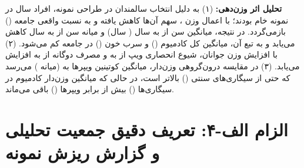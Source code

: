 \documentclass[12pt]{exam}
\begin{document}
\begin{table}[htbp]
\centering
\caption{مقایسه نسبت‌ها (درصدهای) خام و وزن‌دار () برای متغیرهای طبقه‌ای در جمعیت تحلیلی ()}
\end{table}

\textbf{تحلیل اثر وزن‌دهی:} (۱) به دلیل انتخاب  سالمندان در طراحی نمونه، افراد  سال در نمونه خام  بودند؛ با اعمال وزن ، سهم آن‌ها  کاهش یافته و به نسبت واقعی جامعه () بازمی‌گردد. در نتیجه، میانگین سن از  به  سال ( سال) و میانه سن از  به  سال کاهش می‌یابد و به تبع آن، میانگین کل کادمیوم () و سرب خون () در جامعه کم می‌شود. (۲) با افزایش وزن جوانان، شیوع انحصاری ویپ از  به  و مصرف دوگانه از  به  افزایش می‌یابد. (۳) در مقایسه درون‌گروهی وزن‌دار، میانگین کوتینین ویپرها به  (میانه ) می‌رسد که حتی از سیگاری‌های سنتی () بالاتر است، در حالی که میانگین وزن‌دار کادمیوم در سیگاری‌ها () بیش از  برابر ویپرها () باقی می‌ماند.


\section{الزام الف-۴: تعریف دقیق جمعیت تحلیلی و گزارش ریزش نمونه}
\end{document}

